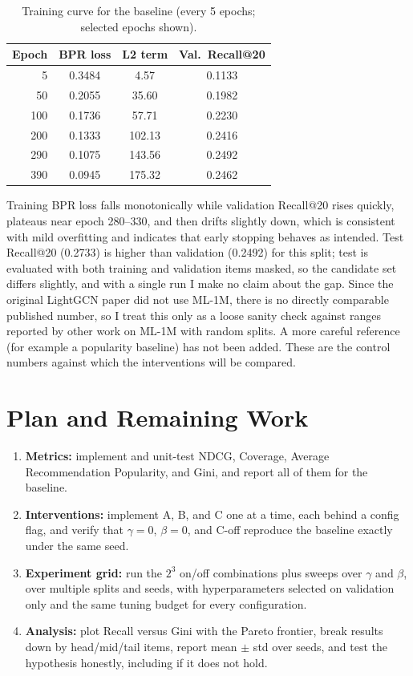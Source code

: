 \documentclass{article}
\begin{document}
\begin{table}[h]
  \caption{Training curve for the baseline (every 5 epochs; selected epochs shown).}
  \label{tab:curve}
  \centering
  \begin{tabular}{rccc}
    \toprule
    Epoch & BPR loss & L2 term & Val.\ Recall@20 \\
    \midrule
    5   & 0.3484 & 4.57   & 0.1133 \\
    50  & 0.2055 & 35.60  & 0.1982 \\
    100 & 0.1736 & 57.71  & 0.2230 \\
    200 & 0.1333 & 102.13 & 0.2416 \\
    290 & 0.1075 & 143.56 & 0.2492 \\
    390 & 0.0945 & 175.32 & 0.2462 \\
    \bottomrule
  \end{tabular}
\end{table}

Training BPR loss falls monotonically while validation Recall@20 rises quickly, plateaus near epoch 280--330, and then drifts slightly down, which is consistent with mild overfitting and indicates that early stopping behaves as intended. Test Recall@20 (0.2733) is higher than validation (0.2492) for this split; test is evaluated with both training and validation items masked, so the candidate set differs slightly, and with a single run I make no claim about the gap. Since the original LightGCN paper did not use ML-1M, there is no directly comparable published number, so I treat this only as a loose sanity check against ranges reported by other work on ML-1M with random splits. A more careful reference (for example a popularity baseline) has not been added. These are the control numbers against which the interventions will be compared.

\section{Plan and Remaining Work}
\label{sec:plan}

\begin{enumerate}
  \item \textbf{Metrics:} implement and unit-test NDCG, Coverage, Average Recommendation Popularity, and Gini, and report all of them for the baseline.
  \item \textbf{Interventions:} implement A, B, and C one at a time, each behind a config flag, and verify that $\gamma = 0$, $\beta = 0$, and C-off reproduce the baseline exactly under the same seed.
  \item \textbf{Experiment grid:} run the $2^3$ on/off combinations plus sweeps over $\gamma$ and $\beta$, over multiple splits and seeds, with hyperparameters selected on validation only and the same tuning budget for every configuration.
  \item \textbf{Analysis:} plot Recall versus Gini with the Pareto frontier, break results down by head/mid/tail items, report mean $\pm$ std over seeds, and test the hypothesis honestly, including if it does not hold.
\end{enumerate}
\end{document}
